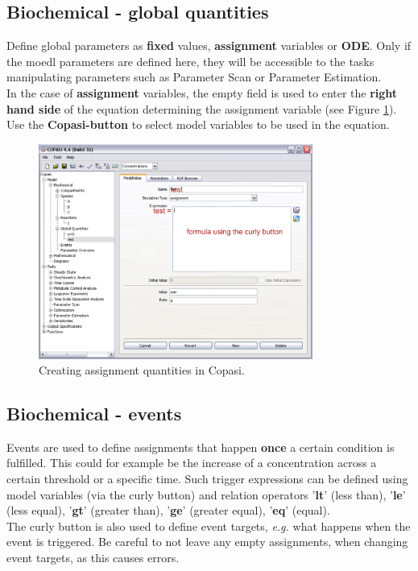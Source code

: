 \documentclass[a4paper,11pt,twoside]{article}
\begin{document}
\subsection{Biochemical - global quantities}
\label{sub:Biochem3}
Define global parameters as \textbf{fixed} values, \textbf{assignment} variables or \textbf{ODE}. Only if the moedl parameters are defined here, they will be accessible to the tasks manipulating parameters such as Parameter Scan or Parameter Estimation.\\
In the case of \textbf{assignment} variables, the empty field is used to enter the \textbf{right hand side} of the equation determining the assignment  variable  (see  Figure  \ref{fig:GQ}). Use  the \textbf{Copasi-button} to select model variables to be used in the
equation. 

\begin{figure}[b!]
 \centering
 \includegraphics[width=09cm]{Pictures/CopasiGQ.pdf}
 \caption{\footnotesize Creating assignment quantities in Copasi.}
 \label{fig:GQ}
\end{figure}

\subsection{Biochemical - events}
\label{sub:Biochem4}
Events are used to define assignments that happen \textbf{once} a certain condition is fulfilled. This could for example be the increase of a concentration across a certain threshold or a specific time. Such trigger expressions can be defined using model variables (via the curly button) and relation operators '\textbf{lt}' (less than), '\textbf{le}' (less equal), '\textbf{gt}' (greater than), '\textbf{ge}' (greater equal), '\textbf{eq}' (equal).\\
The curly button is also used to define event targets, \textit{e.g.} what happens when the event is triggered. Be careful to not leave any empty assignments, when changing event targets, as this causes errors.
\end{document}
